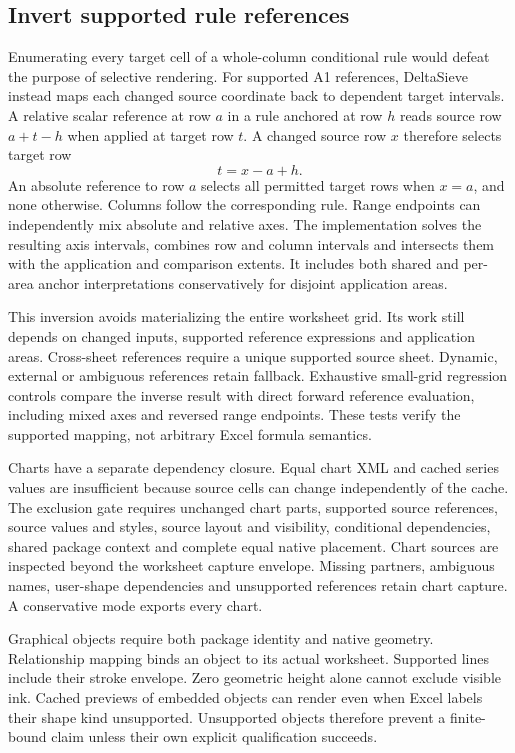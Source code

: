 \subsection{Invert supported rule references}
Enumerating every target cell of a whole-column conditional rule would defeat
the purpose of selective rendering. For supported A1 references, DeltaSieve
instead maps each changed source coordinate back to dependent target intervals.
A relative scalar reference at row $a$ in a rule anchored at row $h$ reads source
row $a+t-h$ when applied at target row $t$. A changed source row $x$ therefore
selects target row
\[
 t=x-a+h.
\]
An absolute reference to row $a$ selects all permitted target rows when $x=a$,
and none otherwise. Columns follow the corresponding rule. Range endpoints
can independently mix absolute and relative axes. The implementation solves the
resulting axis intervals, combines row and column intervals and intersects them
with the application and comparison extents. It includes both shared and per-area
anchor interpretations conservatively for disjoint application areas.

This inversion avoids materializing the entire worksheet grid. Its work still
depends on changed inputs, supported reference expressions and application areas.
Cross-sheet references require a unique supported source sheet. Dynamic, external
or ambiguous references retain fallback. Exhaustive small-grid regression
controls compare the inverse result with direct forward reference evaluation,
including mixed axes and reversed range endpoints. These tests verify the
supported mapping, not arbitrary Excel formula semantics.

Charts have a separate dependency closure. Equal chart XML and cached series
values are insufficient because source cells can change independently of the
cache. The exclusion gate requires unchanged chart parts, supported source
references, source values and styles, source layout and visibility, conditional
dependencies, shared package context and complete equal native placement.
Chart sources are inspected beyond the worksheet capture envelope. Missing
partners, ambiguous names, user-shape dependencies and unsupported references
retain chart capture. A conservative mode exports every chart.

Graphical objects require both package identity and native geometry. Relationship
mapping binds an object to its actual worksheet. Supported lines include their
stroke envelope. Zero geometric height alone cannot exclude visible ink.
Cached previews of embedded objects can render even when Excel labels their
shape kind unsupported. Unsupported objects therefore prevent a finite-bound
claim unless their own explicit qualification succeeds.

